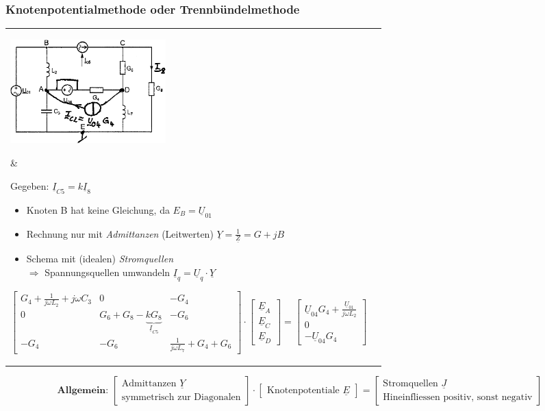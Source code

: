 \subsubsection{Knotenpotentialmethode oder Trennbündelmethode}
\begin{tabular}{ll}
\parbox{6cm}{\includegraphics[width=6cm]{./images/netzwerkanalyse-knotenpotential.png}
	}
	& \parbox{12cm}{
	Gegeben: $\underline{I}_{C5} = k \underline{I}_8$
	\begin{itemize}
      \item Knoten B hat keine Gleichung, da $E_B = \underline{U}_{01}$
      \item Rechnung nur mit \textit{Admittanzen} (Leitwerten) $\underline{Y}
      = \frac{1}{\underline{Z}} = G + jB$
      \item Schema mit (idealen) \textit{Stromquellen}\\
      $\Rightarrow$ Spannungsquellen
      umwandeln $\underline{I}_q = \underline{U}_q \cdot \underline{Y}$
    \end{itemize}
$$\begin{bmatrix}
    G_4 + \frac{1}{j \omega L_2} + j \omega C_3 & 0 & -G_4 \\
    0 & G_6 + G_8 - \underbrace{k G_8}_{\underline{I}_{C5}} & -G_6 \\
    -G_4 & -G_6 & \frac{1}{j \omega L_7} + G_4 + G_6   
	\end{bmatrix} \cdot
\begin{bmatrix}
    \underline{E}_A \\ \underline{E}_C \\ \underline{E}_D
    \end{bmatrix} =
\begin{bmatrix}
    \underline{U}_{04} G_4 + \frac{\underline{U}_{01} }{j \omega L_2}\\ 
    0 \\
    -\underline{U}_{04} G_4 \end{bmatrix}$$    
	}
\end{tabular}

$$\textbf{Allgemein: }\left[ \begin{array}{cc}
       \text{Admittanzen $\underline{Y}$} \\
       \text{symmetrisch zur Diagonalen}
       \end{array}\right] \cdot \left[ \begin{array}{cc}
     \text{Knotenpotentiale $\underline{E}$}
     \end{array}\right] =
\left[ \begin{array}{cc}
     \text{Stromquellen $\underline{J}$} \\
    \text{Hineinfliessen positiv, sonst negativ}
     \end{array}\right]$$


